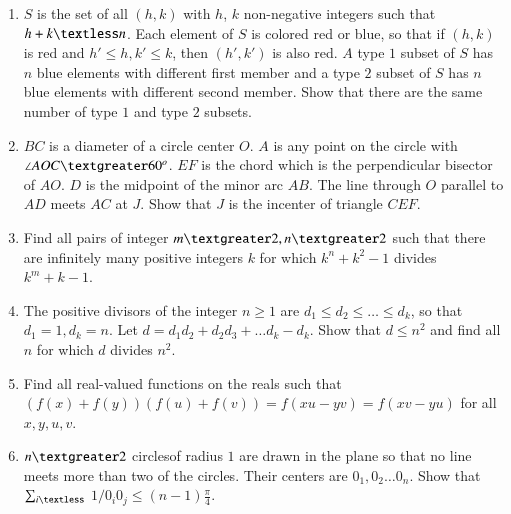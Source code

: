 \documentclass[12pt,-letter paper]{article}
\providecommand{\brak}[1]{\ensuremath{\left(#1\right)}}
\begin{document}
\begin{enumerate}
\item $S$ is the set of all $\brak{h, k}$ with $h$, $k$ non-negative integers such that $h + k \textless n$. Each element of $S$ is colored red or blue, so that if \brak{h, k} is red and $h'\leq h,k'\leq k$, then $\brak{h',k'}$  is also red. $A$ type $1$ subset of $S$ has $n$ blue elements with different first member and a type $2$ subset of $S$ has $n$ blue elements with different second member. Show that there are the same number of type $1$ and type $2$ subsets.
\item $BC$ is a diameter of a circle center $O$. $A$ is any point on the circle with $\angle AOC \textgreater 60^o$. $EF$ is the chord which is the perpendicular bisector of $AO$. $D$ is the midpoint of the minor arc $AB$. The line through $O$ parallel to $AD$ meets $AC$ at $J$. Show that $J$ is the incenter of triangle $CEF$.
\item Find all pairs of integer $m \textgreater 2, n \textgreater 2$  such that there are infinitely many positive integers $k$ for which $k^{n}+k^{2}-1$ divides $k^{m}+k-1$.
\item The positive divisors of the integer $n\geq 1$ are $d_{1}\leq d_{2}\leq \ldots \leq d_{k}$, so that $d_{1}=1, d_{k}=n$. Let $d=d_{1}d_{2}+d_{2}d_{3}+\ldots d_{k}-d_{k}$. Show that $d\leq n^{2}$ and find all $n$ for which $d$ divides $n^{2}$.
\item Find all real-valued functions on the reals such that $\brak{f\brak{x}+f\brak{y}}\brak{f\brak{u}+f\brak{v}}=f\brak{xu-yv}=f\brak{xv-yu}$ for all $x,y,u,v$.
\item $n\textgreater2$ circlesof radius $1$ are drawn in the plane so that no line meets more than two of the circles. Their centers are $0_{1}, 0_{2}\dots0_{n}$. Show that $\sum_{i\textless}$ $1/0_{i}0_{j}\leq \brak{n-1} \frac{\pi}{4}$.
\end{enumerate}
\end{document}
